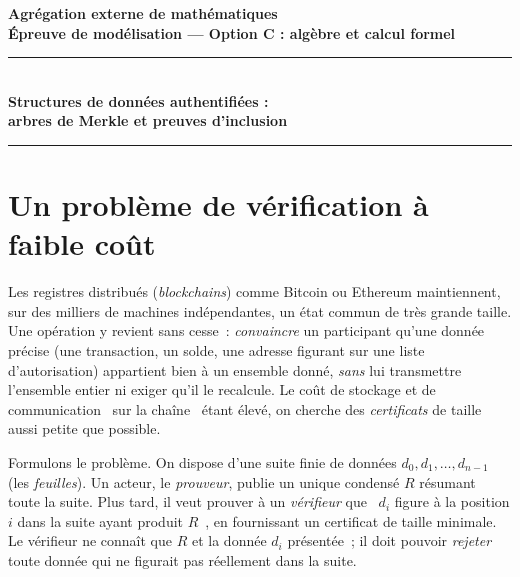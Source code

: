 \documentclass[11pt,a4paper]{article}
\theoremstyle{definition}\newtheorem{definition}{Définition}
\theoremstyle{plain}\newtheorem{theoreme}{Théorème}\newtheorem{proposition}{Proposition}\newtheorem{lemme}{Lemme}
\theoremstyle{remark}\newtheorem{remarque}{Remarque}
\begin{document}
\begin{center}
{\large\bfseries Agrégation externe de mathématiques}\\[3pt]
{\bfseries Épreuve de modélisation --- Option C : algèbre et calcul formel}\\[10pt]
\rule{0.85\linewidth}{0.4pt}\\[8pt]
{\LARGE\bfseries Structures de données authentifiées :\\[2pt] arbres de Merkle et preuves d'inclusion}\\[8pt]
\rule{0.85\linewidth}{0.4pt}
\end{center}

\medskip
\begin{center}
\end{center}

\bigskip
\section{Un problème de vérification à faible coût}

Les registres distribués (\emph{blockchains}) comme Bitcoin ou Ethereum maintiennent, sur des
milliers de machines indépendantes, un état commun de très grande taille. Une opération y revient
sans cesse~: \emph{convaincre} un participant qu'une donnée précise (une transaction, un solde,
une adresse figurant sur une liste d'autorisation) appartient bien à un ensemble donné, \emph{sans}
lui transmettre l'ensemble entier ni exiger qu'il le recalcule. Le coût de stockage et de
communication \guillemotleft~sur la chaîne~\guillemotright{} étant élevé, on cherche des
\emph{certificats} de taille aussi petite que possible.

Formulons le problème. On dispose d'une suite finie de données $d_0, d_1, \dots, d_{n-1}$ (les
\emph{feuilles}). Un acteur, le \emph{prouveur}, publie un unique condensé $R$ résumant toute la
suite. Plus tard, il veut prouver à un \emph{vérifieur} que \guillemotleft~$d_i$ figure à la
position $i$ dans la suite ayant produit $R$~\guillemotright, en fournissant un certificat de
taille minimale. Le vérifieur ne connaît que $R$ et la donnée $d_i$ présentée~; il doit pouvoir
\emph{rejeter} toute donnée qui ne figurait pas réellement dans la suite.
\end{document}
